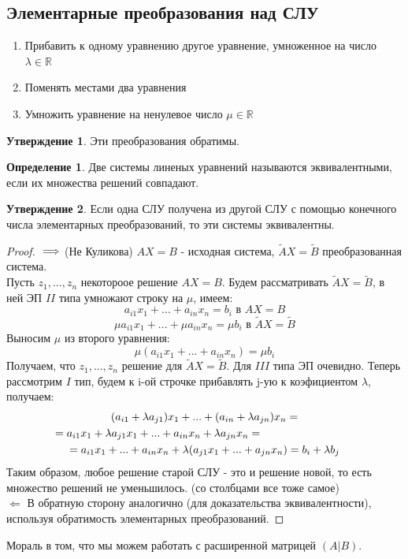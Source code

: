 \documentclass[a4paper, 12pt]{article}
\newcommand{\R}{\mathbb R}
\newcommand\tab[1][.5cm]{\hspace*{#1}}
\theoremstyle{definition}
\newtheorem*{definition}{Определение}
\newtheorem*{subtheorem}{Утверждение}
\begin{document}
    \subsection{Элементарные преобразования над СЛУ}
    \begin{enumerate}
      \item Прибавить к одному уравнению другое уравнение, умноженное на число $\lambda \in \R$
      \item Поменять местами два уравнения
      \item Умножить уравнение на ненулевое число $\mu \in \R$
    \end{enumerate}
    \begin{subtheorem}
      Эти преобразования обратимы.
    \end{subtheorem}
    \begin{definition}
      Две системы линеных уравнений называются эквивалентными, если их множества решений совпадают.
    \end{definition}
    \begin{subtheorem}
      Если одна СЛУ получена из другой СЛУ с помощью конечного числа элементарных преобразований, то эти системы эквивалентны.
    \end{subtheorem}
    \begin{proof}
      $ \\ \Longrightarrow$ (Не Куликова) 
      $AX = B$ - исходная система, $\tilde{A} X = \tilde{B}$ преобразованная система. \\
      Пусть ${z_1,...,z_n}$ некотороое решение $AX = B$. Будем рассматривать $\tilde{A} X = \tilde{B}$, в ней ЭП $II$ типа умножают строку на $\mu$, имеем:
      $$a_{i1}x_1 +...+ a_{in}x_n = b_{i} \text{ в } AX = B$$
      $$\mu a_{i1}x_1 +...+\mu a_{in}x_n = \mu b_i \text{ в } \tilde{A} X = \tilde{B}$$ 
      Выносим $\mu$ из второго уравнения:
      $$\mu (a_{i1}x_1 +...+ a_{in}x_n) = \mu b_i$$
      Получаем, что ${z_1,...,z_n}$ решение для $\tilde{A} X = \tilde{B}$. Для $III$ типа ЭП очевидно. Теперь рассмотрим $I$ тип, будем к i-ой строчке прибавлять j-ую к коэфициентом $\lambda$, получаем:
      \begin{multline*}
      (a_{i1}+\lambda a_{j1})x_1 +...+(a_{in}+\lambda a_{jn})x_n = \\ = a_{i1}x_1+\lambda a_{j1}x_1 +...+a_{in}x_n+\lambda a_{jn}x_n = \tab[3cm] \\ = a_{i1}x_1 + ... + a_{in}x_n + \lambda (a_{j1}x_1 +...+ a_{jn}x_n) = b_i + \lambda b_j
      \end{multline*}
      Таким образом, любое решение старой СЛУ - это и решение новой, то есть множество
      решений не уменьшилось. (со столбцами все тоже самое) \\
      $\Longleftarrow$ В обратную сторону аналогично (для доказательства эквивалентности), используя обратимость элементарных преобразований.
    \end{proof}
    Мораль в том, что мы можем работать с расширенной матрицей $(A|B)$.
\end{document}
